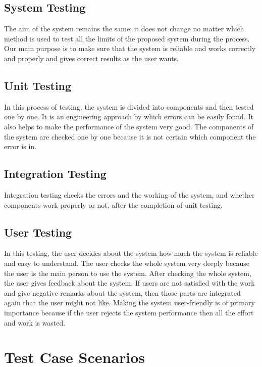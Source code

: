 \subsection{System Testing}

The aim of the system remains the same; it does not change no matter which method is used to test all the limits of the proposed system during the process. Our main purpose is to make sure that the system is reliable and works correctly and properly and gives correct results as the user wants.

\subsection{Unit Testing}

In this process of testing, the system is divided into components and then tested one by one. It is an engineering approach by which errors can be easily found. It also helps to make the performance of the system very good. The components of the system are checked one by one because it is not certain which component the error is in.

\subsection{Integration Testing}

Integration testing checks the errors and the working of the system, and whether components work properly or not, after the completion of unit testing.

\subsection{User Testing}

In this testing, the user decides about the system how much the system is reliable and easy to understand. The user checks the whole system very deeply because the user is the main person to use the system. After checking the whole system, the user gives feedback about the system. If users are not satisfied with the work and give negative remarks about the system, then those parts are integrated again that the user might not like. Making the system user-friendly is of primary importance because if the user rejects the system performance then all the effort and work is wasted.

\section{Test Case Scenarios}

